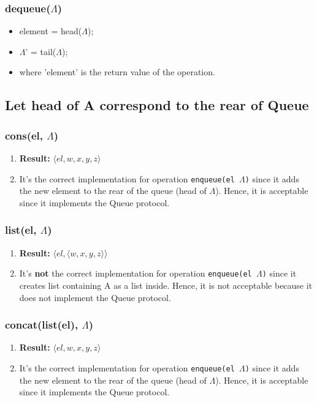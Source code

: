 \subsubsection{dequeue($\Lambda$)}
\begin{itemize}
    \item element = head($\Lambda$);
    \item $\Lambda$' = tail($\Lambda$);
    \item[] where 'element' is the return value of the operation.
\end{itemize}



\subsection{Let head of A correspond to the rear of Queue}

\subsubsection{cons(el, $\Lambda$)}
\begin{enumerate}
    \item[] \textbf{Result:} $\langle el, w, x, y, z \rangle$
    \item[] It's the correct implementation for operation \texttt{enqueue(el $\Lambda$)} since it adds the new element to the rear of the queue (head of $\Lambda$). Hence, it is acceptable since it implements the Queue protocol.
\end{enumerate}

\subsubsection{list(el, $\Lambda$)}
\begin{enumerate}
    \item[] \textbf{Result:} $\langle el, \langle w, x, y, z \rangle \rangle$
    \item[] It's \textbf{not} the correct implementation for operation \texttt{enqueue(el $\Lambda$)} since it creates list containing A as a list inside. Hence, it is not acceptable because it does not implement the Queue protocol.
\end{enumerate}

\subsubsection{concat(list(el), $\Lambda$)}
\begin{enumerate}
    \item[] \textbf{Result:} $\langle el, w, x, y, z \rangle$
    \item[] It's the correct implementation for operation \texttt{enqueue(el $\Lambda$)} since it adds the new element to the rear of the queue (head of $\Lambda$). Hence, it is acceptable since it implements the Queue protocol.
\end{enumerate}
